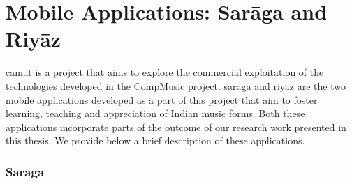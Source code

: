 

\section{Mobile Applications: Sar\={a}ga and Riy\={a}z}
\label{sec:mobile_apps_camut}

\gls{camut} is a project that aims to explore the commercial exploitation of the technologies developed in the CompMusic project. \gls{saraga} and \gls{riyaz} are the two mobile applications developed as a part of this project that aim to foster learning, teaching and appreciation of Indian music forms. Both these applications incorporate parts of the outcome of our research work presented in this thesis. We provide below a brief description of these applications. 

\subsubsection{Sar\={a}ga}
\label{sec:saraga}

